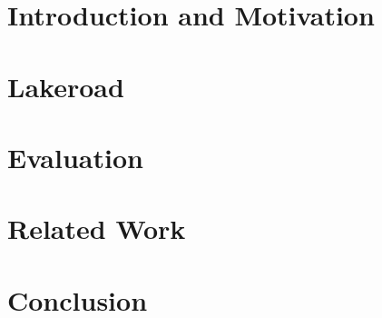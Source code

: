 \chapter{Introduction and Motivation}
\label{chapter:part2-intro}



\chapter{Lakeroad}
\label{chapter:part2-lakeroad-detail}




\chapter{Evaluation}


\chapter{Related Work}


\chapter{Conclusion}

%

